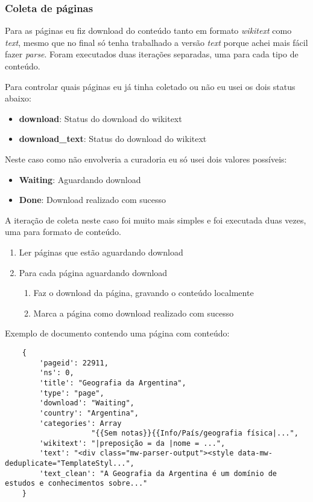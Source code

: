 \subsubsection{Coleta de páginas}

Para as páginas eu fiz download do conteúdo tanto em formato \textit{wikitext} como \textit{text}, mesmo que no final só tenha trabalhado a 
versão \textit{text} porque achei mais fácil fazer \textit{parse}. Foram executados duas iterações separadas, uma para cada tipo de conteúdo.

Para controlar quais páginas eu já tinha coletado ou não eu usei os dois status abaixo:

\begin{itemize}
    \item \textbf{download}: Status do download do wikitext
    \item \textbf{download\_text}: Status do download do wikitext
\end{itemize}

Neste caso como não envolveria a curadoria eu só usei dois valores possíveis:

\begin{itemize}
    \item \textbf{Waiting}: Aguardando download
    \item \textbf{Done}: Download realizado com sucesso
\end{itemize}

A iteração de coleta neste caso foi muito mais simples e foi executada duas vezes, uma para formato de conteúdo.

\begin{enumerate}
    \item Ler páginas que estão aguardando download
    \item Para cada página aguardando download
    \begin{enumerate}
        \item Faz o download da página, gravando o conteúdo localmente
        \item Marca a página como download realizado com sucesso
    \end{enumerate} 
\end{enumerate}

Exemplo de documento contendo uma página com conteúdo:

\begin{lstlisting}
    {
        'pageid': 22911,
        'ns': 0,
        'title': "Geografia da Argentina",
        'type': "page",
        'download': "Waiting",
        'country': "Argentina",
        'categories': Array
                    "{{Sem notas}}{{Info/País/geografia física|...",
        'wikitext': "|preposição = da |nome = ...",
        'text': "<div class="mw-parser-output"><style data-mw-deduplicate="TemplateStyl...",
        'text_clean': "A Geografia da Argentina é um domínio de estudos e conhecimentos sobre..."
    }
\end{lstlisting}

